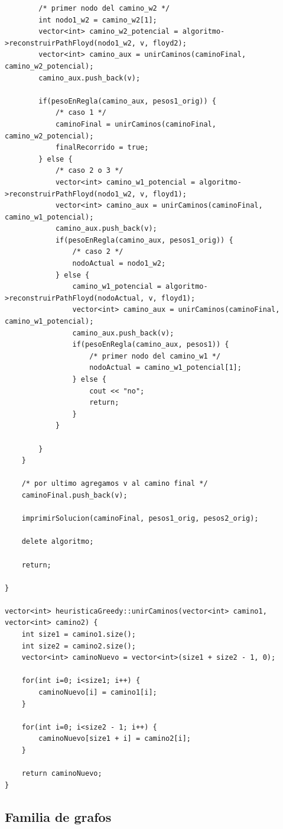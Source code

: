 \begin{lstlisting}
		/* primer nodo del camino_w2 */
		int nodo1_w2 = camino_w2[1];
		vector<int> camino_w2_potencial = algoritmo->reconstruirPathFloyd(nodo1_w2, v, floyd2);
		vector<int> camino_aux = unirCaminos(caminoFinal, camino_w2_potencial);
		camino_aux.push_back(v);

		if(pesoEnRegla(camino_aux, pesos1_orig)) {
			/* caso 1 */
			caminoFinal = unirCaminos(caminoFinal, camino_w2_potencial);
			finalRecorrido = true;
		} else {
			/* caso 2 o 3 */
			vector<int> camino_w1_potencial = algoritmo->reconstruirPathFloyd(nodo1_w2, v, floyd1);
			vector<int> camino_aux = unirCaminos(caminoFinal, camino_w1_potencial);
			camino_aux.push_back(v);
			if(pesoEnRegla(camino_aux, pesos1_orig)) {
				/* caso 2 */
				nodoActual = nodo1_w2;
			} else {
				camino_w1_potencial = algoritmo->reconstruirPathFloyd(nodoActual, v, floyd1);
				vector<int> camino_aux = unirCaminos(caminoFinal, camino_w1_potencial);
				camino_aux.push_back(v);
				if(pesoEnRegla(camino_aux, pesos1)) {
					/* primer nodo del camino_w1 */
					nodoActual = camino_w1_potencial[1]; 				
				} else {
					cout << "no";
					return;
				}
			}
			
		}
	}

	/* por ultimo agregamos v al camino final */
	caminoFinal.push_back(v);

	imprimirSolucion(caminoFinal, pesos1_orig, pesos2_orig);
	
	delete algoritmo;
	
	return;
	
}

vector<int> heuristicaGreedy::unirCaminos(vector<int> camino1, vector<int> camino2) {
	int size1 = camino1.size();
	int size2 = camino2.size();
	vector<int> caminoNuevo = vector<int>(size1 + size2 - 1, 0);
	
	for(int i=0; i<size1; i++) {
		caminoNuevo[i] = camino1[i];
	}

	for(int i=0; i<size2 - 1; i++) {
		caminoNuevo[size1 + i] = camino2[i];
	}

	return caminoNuevo;
}

\end{lstlisting}


\newpage
\subsection{Familia de grafos}
